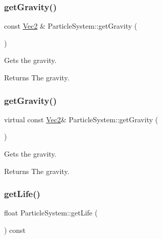 \subsubsection{\texorpdfstring{get\+Gravity()}{getGravity()}\hspace{0.1cm}{\footnotesize\ttfamily [1/2]}}
{\footnotesize\ttfamily const \hyperlink{classVec2}{Vec2} \& Particle\+System\+::get\+Gravity (\begin{DoxyParamCaption}{ }\end{DoxyParamCaption})\hspace{0.3cm}{\ttfamily [virtual]}}

Gets the gravity.

\begin{DoxyReturn}{Returns}
The gravity. 
\end{DoxyReturn}
\mbox{\label{classParticleSystem_a4170082ee1842b93181614cc871b8433}} 
\subsubsection{\texorpdfstring{get\+Gravity()}{getGravity()}\hspace{0.1cm}{\footnotesize\ttfamily [2/2]}}
{\footnotesize\ttfamily virtual const \hyperlink{classVec2}{Vec2}\& Particle\+System\+::get\+Gravity (\begin{DoxyParamCaption}{ }\end{DoxyParamCaption})\hspace{0.3cm}{\ttfamily [virtual]}}

Gets the gravity.

\begin{DoxyReturn}{Returns}
The gravity. 
\end{DoxyReturn}
\mbox{\label{classParticleSystem_a81ac82a5e755de1d33cb3e3521a8f0bd}} 
\subsubsection{\texorpdfstring{get\+Life()}{getLife()}\hspace{0.1cm}{\footnotesize\ttfamily [1/2]}}
{\footnotesize\ttfamily float Particle\+System\+::get\+Life (\begin{DoxyParamCaption}{ }\end{DoxyParamCaption}) const\hspace{0.3cm}{\ttfamily [inline]}}

